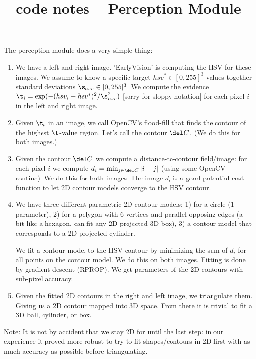 
\lectureNote
\pdflatex

\title{code notes -- Perception Module}


\maketitle

The perception module does a very simple thing:
\begin{enumerate}
\item We have a left and right image. 'EarlyVision' is computing the
  HSV for these images. We assume to know a specific target $hsv^*\in[0,255]^3$
  values together standard deviations $\s_{hsv}\in[0,255]^3$. We compute
  the evidence $\t_i = \exp(- (hsv_i-hsv^*)^2/\s_{hsv}^2)$ [sorry for
    sloppy notation] for each pixel $i$ in the left and right image.

\item Given $\t_i$ in an image, we call OpenCV's flood-fill that finds
  the contour of the highest $\t$-value region. Let's call the contour
  $\del C$. (We do this for both images.)

\item Given the contour $\del C$ we compute a distance-to-contour
  field/image: for each pixel $i$ we compute $d_i = \min_{j\in\del C}
  |i-j|$ (using some OpenCV routine). We do this for both images. The
  image $d_i$ is a good potential cost function to let 2D contour
  models converge to the HSV contour.

\item We have three different parametric 2D contour models: 1) for a
  circle (1 parameter), 2) for a polygon with 6 vertices and parallel
  opposing edges (a bit like a hexagon, can fit any 2D-projected 3D
  box), 3) a contour model that corresponds to a 2D projected
  cylinder.

  We fit a contour model to the HSV contour by minimizing the sum of
  $d_i$ for all points on the contour model. We do this on both
  images. Fitting is done by gradient descent (RPROP). We get
  parameters of the 2D contours with sub-pixel accuracy.

\item Given the fitted 2D contours in the right and left image, we
  triangulate them. Giving us a 2D contour mapped into 3D space. From
  there it is trivial to fit a 3D ball, cylinder, or box.

\end{enumerate}

Note: It is not by accident that we stay 2D for until the last step:
in our experience it proved more robust to try to fit shapes/contours
in 2D first with as much accuracy as possible before triangulating.







